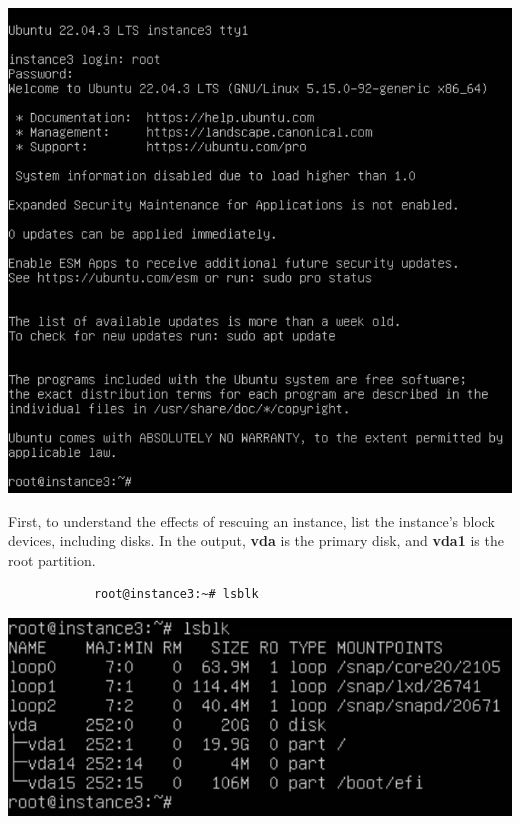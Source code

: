 \documentclass[letterpaper, 12pt]{article}
\begin{document}
\begin{enumerate}
\begin{labstep}
        \begin{center}
            \includegraphics[width=\linewidth]{images/part7/step5.png}
        \end{center}
    \end{labstep}

    \begin{labstep}
        First, to understand the effects of rescuing an instance, list the instance's block devices, including disks.
        In the output, \textbf{vda} is the primary disk, and \textbf{vda1} is the root partition.
        \begin{lstlisting}
            root@instance3:~# lsblk
        \end{lstlisting}

        \begin{center}
            \includegraphics[width=\linewidth]{images/part7/step6.png}
        \end{center}
    \end{labstep}


\end{enumerate}
\end{document}

